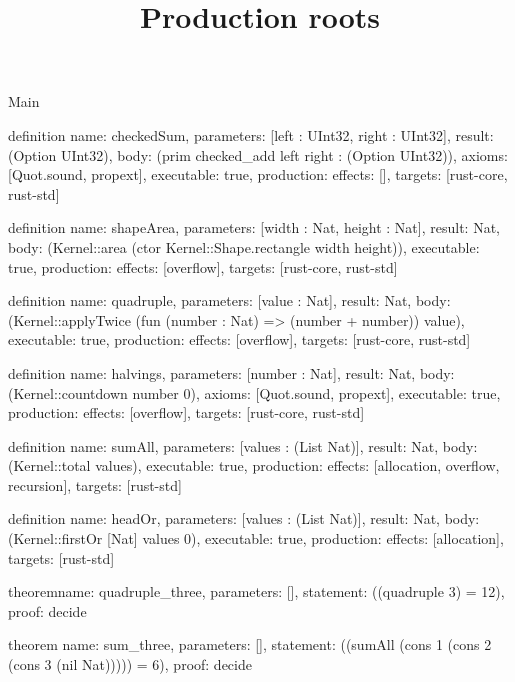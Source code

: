 \begin{lexlean}{Main}
\title{Production roots}
\begin{semanticmodule}
definition{
  name: checkedSum,
  parameters: [left : UInt32, right : UInt32],
  result: (Option UInt32),
  body: (prim checked_add left right : (Option UInt32)),
  axioms: [Quot.sound, propext],
  executable: true,
  production: {effects: [], targets: [rust-core, rust-std]}
}

definition{
  name: shapeArea,
  parameters: [width : Nat, height : Nat],
  result: Nat,
  body: (Kernel::area (ctor Kernel::Shape.rectangle width height)),
  executable: true,
  production: {effects: [overflow], targets: [rust-core, rust-std]}
}

definition{
  name: quadruple,
  parameters: [value : Nat],
  result: Nat,
  body: (Kernel::applyTwice (fun (number : Nat) => (number + number)) value),
  executable: true,
  production: {effects: [overflow], targets: [rust-core, rust-std]}
}

definition{
  name: halvings,
  parameters: [number : Nat],
  result: Nat,
  body: (Kernel::countdown number 0),
  axioms: [Quot.sound, propext],
  executable: true,
  production: {effects: [overflow], targets: [rust-core, rust-std]}
}

definition{
  name: sumAll,
  parameters: [values : (List Nat)],
  result: Nat,
  body: (Kernel::total values),
  executable: true,
  production: {effects: [allocation, overflow, recursion], targets: [rust-std]}
}

definition{
  name: headOr,
  parameters: [values : (List Nat)],
  result: Nat,
  body: (Kernel::firstOr [Nat] values 0),
  executable: true,
  production: {effects: [allocation], targets: [rust-std]}
}

theorem{name: quadruple_three, parameters: [], statement: ((quadruple 3) = 12), proof: decide{}}

theorem{
  name: sum_three,
  parameters: [],
  statement: ((sumAll (cons 1 (cons 2 (cons 3 (nil Nat))))) = 6),
  proof: decide{}
}
\end{semanticmodule}
\end{lexlean}

